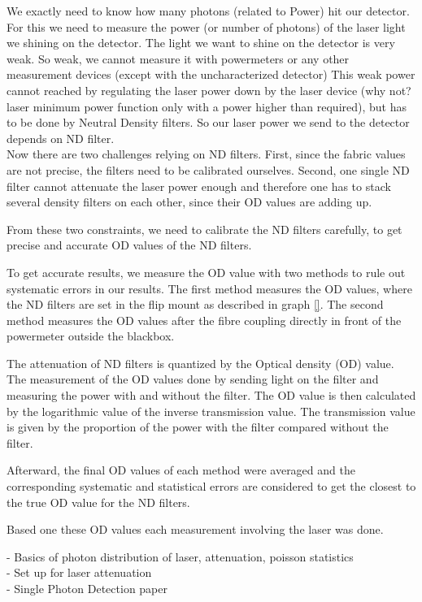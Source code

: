 We exactly need to know how many photons (related to Power) hit our detector.
For this we need to measure the power (or number of photons) of the laser light we shining on the detector.
The light we want to shine on the detector is very weak.
So weak, we cannot measure it with powermeters or any other measurement devices (except with the uncharacterized detector)
This weak power cannot reached by regulating the laser power down by the laser device (why not? laser minimum power function
only with a power higher than required), but has to be done by Neutral Density filters.
So our laser power we send to the detector depends on ND filter.\\

Now there are two challenges relying on ND filters.
First, since the fabric values are not precise, the filters need to be calibrated ourselves.
Second, one single ND filter cannot attenuate the laser power enough and therefore one has to stack several density
filters on each other, since their OD values are adding up.

From these two constraints, we need to calibrate the ND filters carefully, to get precise and accurate OD values of the
ND filters.

To get accurate results, we measure the OD value with two methods to rule out systematic errors in our results.
The first method measures the OD values, where the ND filters are set in the flip mount as described in graph \ref{}.
The second method measures the OD values after the fibre coupling directly in front of the powermeter
outside the blackbox.

The attenuation of ND filters is quantized by the Optical density (OD) value.
The measurement of the OD values done by sending light on the filter and measuring the power with and
without the filter.
The OD value is then calculated by the logarithmic value of the inverse transmission value.
The transmission value is given by the proportion of the power with the filter compared without the filter.

Afterward, the final OD values of each method were averaged and the corresponding systematic and statistical errors are
considered to get the closest to the true OD value for the ND filters.

Based one these OD values each measurement involving the laser was done.






- Basics of photon distribution of laser, attenuation, poisson statistics \\
- Set up for laser attenuation \\
- Single Photon Detection paper \\




